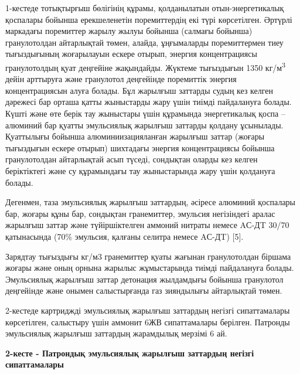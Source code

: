 1-кестеде тотықтырғыш бөлігінің құрамы, қолданылатын отын-энергетикалық
қоспалары бойынша ерекшеленетін поремиттердің екі түрі көрсетілген.
Әртүрлі маркадағы поремиттер жарылу жылуы бойынша (салмағы бойынша)
гранулотолдан айтарлықтай төмен, алайда, ұңғымаларды поремиттермен тиеу
тығыздығының жоғарылауын ескере отырып, энергия концентрациясы
гранулотолдың қуат деңгейіне жақындайды. Жүктеме тығыздығын 1350
кг/м\textsuperscript{3} дейін арттыруға және гранулотол деңгейінде
поремиттік энергия концентрациясын алуға болады. Бұл жарылғыш заттарды
судың кез келген дәрежесі бар орташа қатты жыныстарды жару үшін тиімді
пайдалануға болады. Күшті және өте берік тау жыныстары үшін құрамында
энергетикалық қоспа -- алюминий бар қуатты эмульсиялық жарылғыш заттарды
қолдану ұсынылады. Қуаттылығы бойынша алюминиизацияланған жарылғыш
заттар (жоғары тығыздығын ескере отырып) шихтадағы энергия
концентрациясы бойынша гранулотолдан айтарлықтай асып түседі, сондықтан
оларды кез келген беріктіктегі және су құрамындағы тау жыныстарында жару
үшін қолдануға болады.

Дегенмен, таза эмульсиялық жарылғыш заттардың, әсіресе алюминий
қоспалары бар, жоғары құны бар, сондықтан гранемиттер, эмульсия
негізіндегі аралас жарылғыш заттар және түйіршіктелген аммоний нитраты
немесе AС-ДT 30/70 қатынасында (70\% эмульсия, қалғаны селитра немесе
AС-ДT) {[}5{]}.

Зарядтау тығыздығы кг/м3 гранемиттер қуаты жағынан гранулотолдан біршама
жоғары және оның орнына жарылыс жұмыстарында тиімді пайдалануға болады.
Эмульсиялық жарылғыш заттар детонация жылдамдығы бойынша гранулотол
деңгейінде және онымен салыстырғанда газ зияндылығы айтарлықтай төмен.

2-кестеде картриджді эмульсиялық жарылғыш заттардың негізгі
сипаттамалары көрсетілген, салыстыру үшін аммонит 6ЖВ сипаттамалары
берілген. Патронды эмульсиялық жарылғыш заттардың жарамдылық мерзімі 6
ай.

{\bfseries 2-кесте - Патрондық эмульсиялық жарылғыш заттардың негізгі
сипаттамалары}

